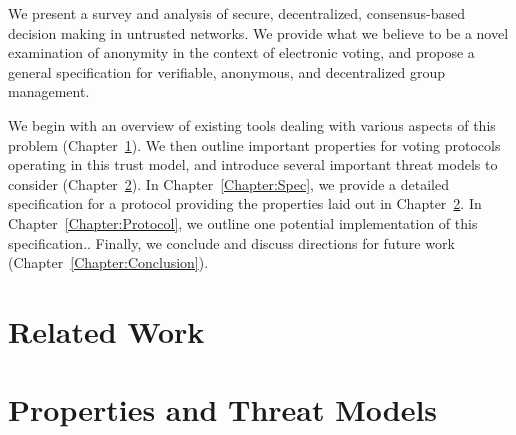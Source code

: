 \documentclass[finalcopy,nolof,nolot]{srpaper}
\begin{document}
We present a survey and analysis of secure, decentralized, consensus-based
decision making in untrusted networks. We provide what we believe to be a novel
examination of anonymity in the context of electronic voting, and propose a
general specification for verifiable, anonymous, and decentralized group
management.

We begin with an overview of existing tools dealing with various aspects of this
problem (Chapter~\ref{Chapter:Existing}).  We then outline important properties
for voting protocols operating in this trust model, and introduce several
important threat models to consider (Chapter~\ref{Chapter:Goals}).  In
Chapter~\ref{Chapter:Spec}, we provide a detailed specification for a protocol
providing the properties laid out in Chapter~\ref{Chapter:Goals}. In
Chapter~\ref{Chapter:Protocol}, we outline one potential implementation of this
specification.. Finally, we conclude and discuss
directions for future work (Chapter~\ref{Chapter:Conclusion}).

%

\chapter{Related Work}\label{Chapter:Existing}


\chapter{Properties and Threat Models}\label{Chapter:Goals}


% 
%
% 
%
\end{document}
